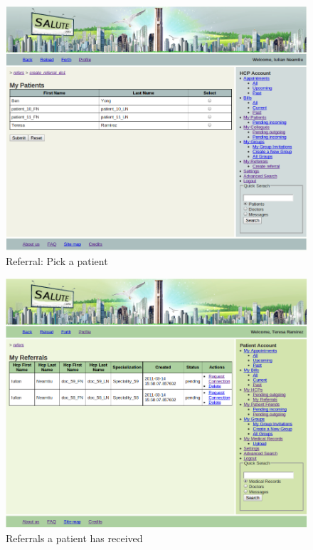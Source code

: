 \begin{figure}
\includegraphics[scale=0.5]{screenshots/referrals_my_patients.png}
\caption{Referral: Pick a patient}
\end{figure}

\begin{figure}
\includegraphics[scale=0.5]{screenshots/patient_my_referral.png}
\caption{Referrals a patient has received}
\end{figure}

